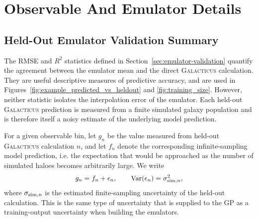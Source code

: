 \documentclass[twocolumn, apj, numberedappendix, iop]{openjournal}
\newcommand{\galacticus}{\textsc{Galacticus}\xspace}
\begin{document}
\section{Observable And Emulator Details}
\label{app:observable-details}


\subsection{Held-Out Emulator Validation Summary}
\label{app:emulator-validation-summary}

The RMSE and $R^2$ statistics defined in
Section~\ref{sec:emulator-validation} quantify the agreement between the
emulator mean and the direct \galacticus{} calculation. They are useful
descriptive measures of predictive accuracy, and are used in
Figures~\ref{fig:example_predicted_vs_heldout} and \ref{fig:training_size}.
However, neither statistic isolates the interpolation error of the emulator.
Each held-out \galacticus{} prediction is measured from a finite simulated
galaxy population and is therefore itself a noisy estimate of the underlying
model prediction.

For a given observable bin, let $g_n$ be the value measured from held-out
\galacticus{} calculation $n$, and let $f_n$ denote the corresponding infinite-sampling model prediction, i.e. the expectation that would be approached as the number of simulated haloes becomes arbitrarily large. We write
\begin{equation}
  g_n = f_n + \epsilon_n,
  \qquad
  {\rm Var}(\epsilon_n) = \sigma_{{\rm sim},n}^2,
\end{equation}
where $\sigma_{{\rm sim},n}$ is the estimated finite-sampling uncertainty of
the held-out calculation. This is the same type of uncertainty that is
supplied to the GP as a training-output uncertainty when building the emulators.
\end{document}
